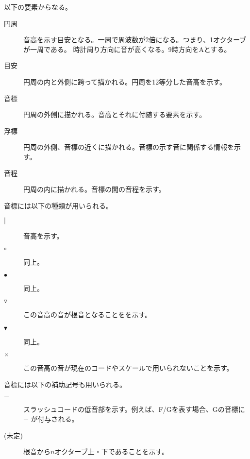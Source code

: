 \documentclass[b5]{ltjsbook}
\begin{document}

以下の要素からなる。
\begin{description}
\item[円周] 音高を示す目安となる。一周で周波数が2倍になる。つまり、1オクターブが一周である。
  時計周り方向に音が高くなる。9時方向をAとする。
\item[目安] 円周の内と外側に跨って描かれる。円周を12等分した音高を示す。
\item[音標] 円周の外側に描かれる。音高とそれに付随する要素を示す。
\item[浮標] 円周の外側、音標の近くに描かれる。音標の示す音に関係する情報を示す。
\item[音程] 円周の内に描かれる。音標の間の音程を示す。
\end{description}

音標には以下の種類が用いられる。

\begin{description}
\item[$|$] 音高を示す。
\item[$\circ$] 同上。
\item[$\bullet$] 同上。
\item[$\triangledown$] この音高の音が根音となることをを示す。
\item[$\blacktriangledown$] 同上。
\item[$\times$] この音高の音が現在のコードやスケールで用いられないことを示す。
\end{description}

音標には以下の補助記号も用いられる。

\begin{description}
\item[$-$] スラッシュコードの低音部を示す。例えば、F/Gを表す場合、Gの音標に$-$
  が付与される。
\item[(未定)] 根音から$n$オクターブ上・下であることを示す。
\end{description}
\end{document}
